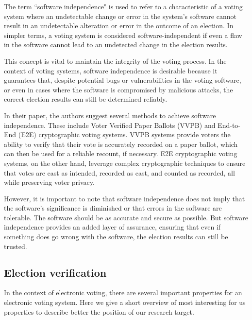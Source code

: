 The term ``software independence" is used to refer to a characteristic of a voting system where an undetectable change or error in the system's software cannot result in an undetectable alteration or error in the outcome of an election. In simpler terms, a voting system is considered software-independent if even a flaw in the software cannot lead to an undetected change in the election results. 

This concept is vital to maintain the integrity of the voting process. In the context of voting systems, software independence is desirable because it guarantees that, despite potential bugs or vulnerabilities in the voting software, or even in cases where the software is compromised by malicious attacks, the correct election results can still be determined reliably. 

In their paper, the authors suggest several methods to achieve software independence. These include Voter Verified Paper Ballots (VVPB) and End-to-End (E2E) cryptographic voting systems. VVPB systems provide voters the ability to verify that their vote is accurately recorded on a paper ballot, which can then be used for a reliable recount, if necessary. E2E cryptographic voting systems, on the other hand, leverage complex cryptographic techniques to ensure that votes are cast as intended, recorded as cast, and counted as recorded, all while preserving voter privacy.

However, it is important to note that software independence does not imply that the software's significance is diminished or that errors in the software are tolerable. The software should be as accurate and secure as possible. But software independence provides an added layer of assurance, ensuring that even if something does go wrong with the software, the election results can still be trusted.


\subsection{Election verification} 

In the context of electronic voting, there are several important properties for an electronic voting system. Here we give a short overview of most interesting for us properties to describe better the position of our research target.

